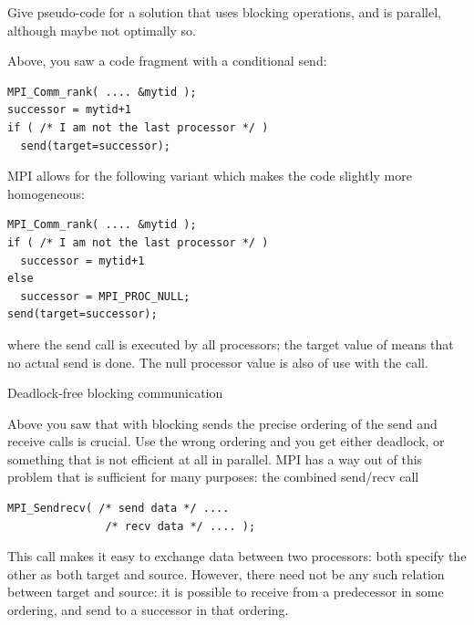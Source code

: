 \begin{exercise}
  Give pseudo-code for a solution that uses blocking operations, and is
  parallel, although maybe not optimally so.
\end{exercise}

Above, you saw a code fragment with a conditional send:
\begin{verbatim}
MPI_Comm_rank( .... &mytid );
successor = mytid+1
if ( /* I am not the last processor */ )
  send(target=successor);
\end{verbatim}
MPI allows for the following variant which makes the code slightly 
more homogeneous:
\begin{verbatim}
MPI_Comm_rank( .... &mytid );
if ( /* I am not the last processor */ )
  successor = mytid+1
else
  successor = MPI_PROC_NULL;
send(target=successor);
\end{verbatim}
where the send call is executed by all processors; the target value
of  means that no actual send is done. 
The null processor
value is also of use with the  call.

 {Deadlock-free blocking communication}

Above you saw that with blocking sends the precise ordering of the
send and receive calls is crucial. Use the wrong ordering and you get
either deadlock, or something that is not efficient at all in
parallel. MPI has a way out of this problem that is sufficient for
many purposes: the combined send/recv call
\begin{verbatim}
MPI_Sendrecv( /* send data */ ....
               /* recv data */ .... );
\end{verbatim}
This call makes it easy to exchange data between two processors: both
specify the other as both target and source. However, there need not
be any such relation between target and source: it is possible to
receive from a predecessor in some ordering, and send to a successor
in that ordering.

